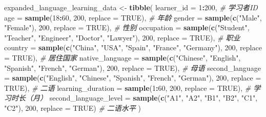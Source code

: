 \documentclass[]{book}
\newenvironment{Shaded}{\begin{snugshade}}{\end{snugshade}}
\newcommand{\CommentTok}[1]{\textcolor[rgb]{0.56,0.35,0.01}{\textit{#1}}}
\newcommand{\DataTypeTok}[1]{\textcolor[rgb]{0.13,0.29,0.53}{#1}}
\newcommand{\DecValTok}[1]{\textcolor[rgb]{0.00,0.00,0.81}{#1}}
\newcommand{\KeywordTok}[1]{\textcolor[rgb]{0.13,0.29,0.53}{\textbf{#1}}}
\newcommand{\NormalTok}[1]{#1}
\newcommand{\OperatorTok}[1]{\textcolor[rgb]{0.81,0.36,0.00}{\textbf{#1}}}
\newcommand{\OtherTok}[1]{\textcolor[rgb]{0.56,0.35,0.01}{#1}}
\newcommand{\StringTok}[1]{\textcolor[rgb]{0.31,0.60,0.02}{#1}}
\begin{document}
\begin{Shaded}
\begin{Highlighting}[]
\NormalTok{expanded_language_learning_data <-}\StringTok{ }\KeywordTok{tibble}\NormalTok{(}
  \DataTypeTok{learner_id =} \DecValTok{1}\OperatorTok{:}\DecValTok{200}\NormalTok{,  }\CommentTok{# 学习者ID}
  \DataTypeTok{age =} \KeywordTok{sample}\NormalTok{(}\DecValTok{18}\OperatorTok{:}\DecValTok{60}\NormalTok{, }\DecValTok{200}\NormalTok{, }\DataTypeTok{replace =} \OtherTok{TRUE}\NormalTok{),  }\CommentTok{# 年龄}
  \DataTypeTok{gender =} \KeywordTok{sample}\NormalTok{(}\KeywordTok{c}\NormalTok{(}\StringTok{"Male"}\NormalTok{, }\StringTok{"Female"}\NormalTok{), }\DecValTok{200}\NormalTok{, }\DataTypeTok{replace =} \OtherTok{TRUE}\NormalTok{),  }\CommentTok{# 性别}
  \DataTypeTok{occupation =} \KeywordTok{sample}\NormalTok{(}\KeywordTok{c}\NormalTok{(}\StringTok{"Student"}\NormalTok{, }\StringTok{"Teacher"}\NormalTok{, }\StringTok{"Engineer"}\NormalTok{, }\StringTok{"Doctor"}\NormalTok{, }\StringTok{"Lawyer"}\NormalTok{), }\DecValTok{200}\NormalTok{, }\DataTypeTok{replace =} \OtherTok{TRUE}\NormalTok{),  }\CommentTok{# 职业}
  \DataTypeTok{country =} \KeywordTok{sample}\NormalTok{(}\KeywordTok{c}\NormalTok{(}\StringTok{"China"}\NormalTok{, }\StringTok{"USA"}\NormalTok{, }\StringTok{"Spain"}\NormalTok{, }\StringTok{"France"}\NormalTok{, }\StringTok{"Germany"}\NormalTok{), }\DecValTok{200}\NormalTok{, }\DataTypeTok{replace =} \OtherTok{TRUE}\NormalTok{),  }\CommentTok{# 居住国家}
  \DataTypeTok{native_language =} \KeywordTok{sample}\NormalTok{(}\KeywordTok{c}\NormalTok{(}\StringTok{"Chinese"}\NormalTok{, }\StringTok{"English"}\NormalTok{, }\StringTok{"Spanish"}\NormalTok{, }\StringTok{"French"}\NormalTok{, }\StringTok{"German"}\NormalTok{), }\DecValTok{200}\NormalTok{, }\DataTypeTok{replace =} \OtherTok{TRUE}\NormalTok{),  }\CommentTok{# 母语}
  \DataTypeTok{second_language =} \KeywordTok{sample}\NormalTok{(}\KeywordTok{c}\NormalTok{(}\StringTok{"English"}\NormalTok{, }\StringTok{"Chinese"}\NormalTok{, }\StringTok{"Spanish"}\NormalTok{, }\StringTok{"French"}\NormalTok{, }\StringTok{"German"}\NormalTok{), }\DecValTok{200}\NormalTok{, }\DataTypeTok{replace =} \OtherTok{TRUE}\NormalTok{),  }\CommentTok{# 二语}
  \DataTypeTok{learning_duration =} \KeywordTok{sample}\NormalTok{(}\DecValTok{1}\OperatorTok{:}\DecValTok{60}\NormalTok{, }\DecValTok{200}\NormalTok{, }\DataTypeTok{replace =} \OtherTok{TRUE}\NormalTok{),  }\CommentTok{# 学习时长（月）}
  \DataTypeTok{second_language_level =} \KeywordTok{sample}\NormalTok{(}\KeywordTok{c}\NormalTok{(}\StringTok{"A1"}\NormalTok{, }\StringTok{"A2"}\NormalTok{, }\StringTok{"B1"}\NormalTok{, }\StringTok{"B2"}\NormalTok{, }\StringTok{"C1"}\NormalTok{, }\StringTok{"C2"}\NormalTok{), }\DecValTok{200}\NormalTok{, }\DataTypeTok{replace =} \OtherTok{TRUE}\NormalTok{)  }\CommentTok{# 二语水平}
\NormalTok{)}
\end{Highlighting}
\end{Shaded}
\end{document}
